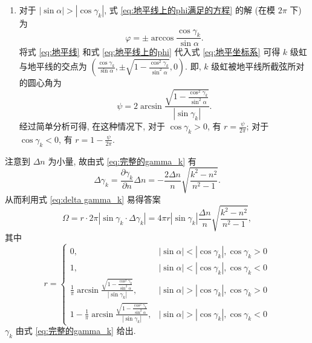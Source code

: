 \documentclass{article}
\begin{document}
\begin{enumerate}
\begin{enumerate}
\begin{enumerate}
		\item
		对于 $\left|\sin\alpha\right|>\left|\cos\gamma_k\right|$, 式 \ref{eq:地平线上的phi满足的方程} 的解 (在模 $2\pi$ 下) 为
		\begin{equation}
			\varphi=\pm\arccos\frac{\cos\gamma_k}{\sin\alpha}.
			\label{eq:地平线上的phi}
		\end{equation}
		将式 \ref{eq:地平线} 和式 \ref{eq:地平线上的phi} 代入式 \ref{eq:地平坐标系} 可得 $k$ 级虹与地平线的交点为
		$\left(\frac{\cos\gamma_k}{\sin\alpha},\pm\sqrt{1-\frac{\cos^2\gamma_k}{\sin^2\alpha}},0\right)$.
		即, $k$ 级虹被地平线所截弦所对的圆心角为
		\begin{equation}
			\psi=2\arcsin\frac{\sqrt{1-\frac{\cos^2\gamma_k}{\sin^2\alpha}}}{\left|\sin\gamma_k\right|}.
		\end{equation}
		经过简单分析可得, 在这种情况下, 对于 $\cos\gamma_k>0$, 有 $r=\frac\psi{2\pi}$; 对于 $\cos\gamma_k<0$, 有 $r=1-\frac\psi{2\pi}$.

	\end{enumerate}

	注意到 $\Delta n$ 为小量, 故由式 \ref{eq:完整的gamma_k} 有
	\begin{equation}
		\Delta\gamma_k=\frac{\partial\gamma_k}{\partial n}\Delta n=-\frac{2\Delta n}n\sqrt{\frac{k^2-n^2}{n^2-1}}.
		\label{eq:delta gamma_k}
	\end{equation}
	从而利用式 \ref{eq:delta gamma_k} 易得答案
	\begin{equation}
		\Omega=r\cdot2\pi\left|\sin\gamma_k\cdot\Delta\gamma_k\right|=4\pi r\left|\sin\gamma_k\right|\frac{\Delta n}n\sqrt{\frac{k^2-n^2}{n^2-1}},
	\end{equation}
	其中
	\begin{equation}
		r=
		\begin{cases}
			0, & \left|\sin\alpha\right|<\left|\cos\gamma_k\right|,\cos\gamma_k>0\\
			1, & \left|\sin\alpha\right|<\left|\cos\gamma_k\right|,\cos\gamma_k<0\\
			\frac1\pi\arcsin\frac{\sqrt{1-\frac{\cos^2\gamma_k}{\sin^2\alpha}}}{\left|\sin\gamma_k\right|}, & \left|\sin\alpha\right|>\left|\cos\gamma_k\right|,\cos\gamma_k>0\\
			1-\frac1\pi\arcsin\frac{\sqrt{1-\frac{\cos^2\gamma_k}{\sin^2\alpha}}}{\left|\sin\gamma_k\right|}, & \left|\sin\alpha\right|>\left|\cos\gamma_k\right|,\cos\gamma_k<0
		\end{cases}
	\end{equation}
	$\gamma_k$ 由式 \ref{eq:完整的gamma_k} 给出.


\end{enumerate}
\end{enumerate}
\end{document}
